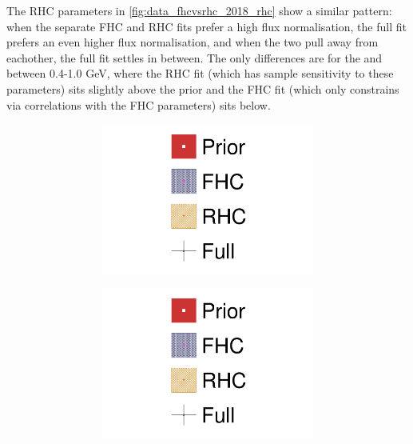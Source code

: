 The RHC parameters in \autoref{fig:data_fhcvsrhc_2018_rhc} show a similar pattern: when the separate FHC and RHC fits prefer a high flux normalisation, the full fit prefers an even higher flux normalisation, and when the two pull away from eachother, the full fit settles in between. The only differences are for the \numubar and \nuebar between 0.4-1.0 GeV, where the RHC fit (which has sample sensitivity to these parameters) sits slightly above the prior and the FHC fit (which only constrains via correlations with the FHC parameters) sits below.
\begin{figure}[h]
	\centering
	\begin{subfigure}[t]{\textwidth}
		\begin{subfigure}[t]{0.24\textwidth}
			\includegraphics[width=\textwidth,page=6, trim={0mm 0mm 0mm 9mm}, clip]{figures/mach3/2018/data/2018a_FixedCov_RedCov_Mpi_NeuOnly_Data_merge_2018a_FixedCov_RedCov_Mpi_NeuBarOnly_Data_merge_2018a_FixedCov_RedCov_Mpi_Data_merge}
		\end{subfigure}
		\begin{subfigure}[t]{0.24\textwidth}
			\includegraphics[width=\textwidth,page=7, trim={0mm 0mm 0mm 9mm}, clip]{figures/mach3/2018/data/2018a_FixedCov_RedCov_Mpi_NeuOnly_Data_merge_2018a_FixedCov_RedCov_Mpi_NeuBarOnly_Data_merge_2018a_FixedCov_RedCov_Mpi_Data_merge}

\end{subfigure}
\end{subfigure}
\end{figure}
